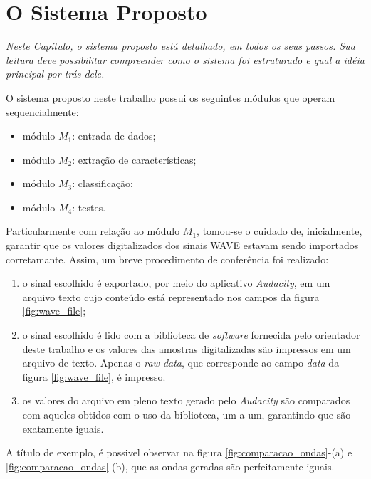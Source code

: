 \documentclass[a4paper,12pt,oneside]{report}
\begin{document}
\chapter {O Sistema Proposto}
\emph{Neste Cap\'{i}tulo, o sistema proposto est\'{a} detalhado, em todos os seus passos. Sua leitura deve possibilitar compreender como o sistema foi estruturado e qual a id\'{e}ia principal por tr\'{a}s dele.}
\\
\par O sistema proposto neste trabalho possui os seguintes m\'{o}dulos que operam sequencialmente:
\begin{itemize}
\item{}m\'{o}dulo $M_1$: entrada de dados;
\item{}m\'{o}dulo $M_2$: extra\c{c}\~{a}o de caracter\'{i}sticas;
\item{}m\'{o}dulo $M_3$: classifica\c{c}\~{a}o;
\item{}m\'{o}dulo $M_4$: testes.
\end{itemize}
\par Particularmente com rela\c{c}\~{a}o ao m\'{o}dulo $M_1$, tomou-se o cuidado de, inicialmente, garantir que os valores digitalizados dos sinais WAVE estavam sendo importados corretamante. Assim, um breve procedimento de confer\^{e}ncia foi realizado: 
\begin{enumerate}
\item o sinal escolhido \'{e} exportado, por meio do aplicativo \textit{Audacity}, em um arquivo texto cujo conte\'{u}do est\'{a} representado nos campos da figura \ref{fig:wave_file};
\item o sinal escolhido \'{e} lido com a biblioteca de \textit{software} fornecida pelo orientador deste trabalho e os valores das amostras digitalizadas s\~{a}o impressos em um arquivo de texto. Apenas o \emph{raw data}, que corresponde ao campo \emph{data} da figura \ref{fig:wave_file}, \'{e} impresso.
\item os valores do arquivo em pleno texto gerado pelo \textit{Audacity} s\~{a}o comparados com aqueles obtidos com o uso da biblioteca, um a um, garantindo que s\~{a}o exatamente iguais.
\end{enumerate}
\par A t\'{i}tulo de exemplo, \'{e} possivel observar na figura \ref{fig:comparacao_ondas}-(a) e \ref{fig:comparacao_ondas}-(b), que as ondas geradas s\~{a}o perfeitamente iguais.
\end{document}
